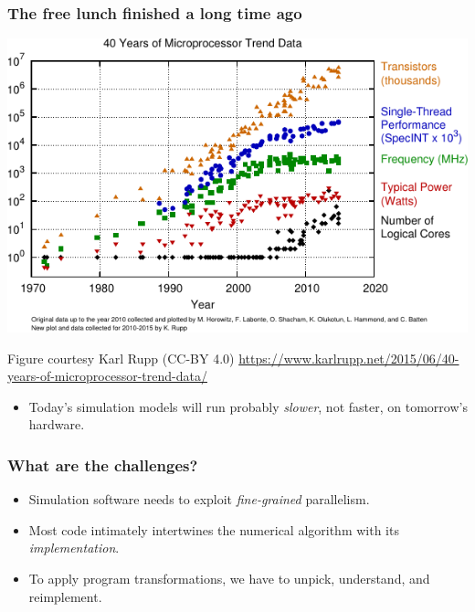 \documentclass[presentation]{beamer}
\begin{document}
\begin{frame}
  \frametitle{The free lunch finished a long time ago}
    \begin{center}
      \includegraphics[height=0.5\textheight]{processor-trends}
    \end{center}
    \begin{flushright}
      {\tiny Figure courtesy Karl Rupp (CC-BY 4.0) \url{https://www.karlrupp.net/2015/06/40-years-of-microprocessor-trend-data/}}
    \end{flushright}
  \begin{itemize}
  \item Today's simulation models will run probably \emph{slower}, not faster, on
    tomorrow's hardware.
  \end{itemize}
\end{frame}

\begin{frame}
  \frametitle{What are the challenges?}
  \begin{itemize}
  \item Simulation software needs to exploit \emph{fine-grained}
    parallelism.
  \item Most code intimately intertwines the numerical algorithm with
    its \emph{implementation}.
  \item To apply program transformations, we have to unpick,
    understand, and reimplement.
  \end{itemize}
\end{frame}
\end{document}
